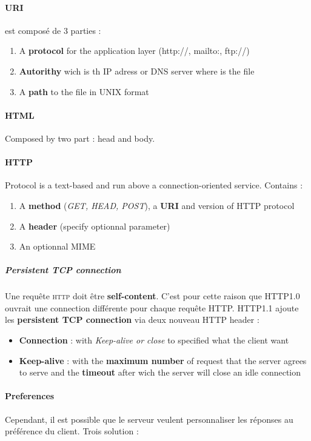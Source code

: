 \paragraph{\textbf{URI}} est composé de 3 parties :
\begin{enumerate}
    \item A \textbf{protocol} for the application layer (http://, mailto:, ftp://)
    \item \textbf{Autorithy} wich is th IP adress or DNS server where is the file
    \item A \textbf{path} to the file in UNIX format
\end{enumerate}

\paragraph{\textbf{HTML}} 
Composed by two part : head and body.

\paragraph{\textbf{HTTP}}
Protocol is a text-based and run above a connection-oriented service. Contains :
\begin{enumerate}
    \item A \textbf{method} (\textit{GET, HEAD, POST}), a \textbf{URI} and version of HTTP protocol
    \item A \textbf{header} (specify optionnal parameter)
    \item An optionnal MIME
\end{enumerate}

\subparagraph{Persistent TCP connection}
Une requête \textsc{http} doit être \textbf{self-content}. C'est pour cette
raison que HTTP1.0 ouvrait une connection différente pour chaque requête HTTP.
HTTP1.1 ajoute les \textbf{persistent TCP connection} via
deux nouveau HTTP header :
\begin{itemize}
    \item \textbf{Connection} : with \textit{Keep-alive or close} to specified what 
        the client want
    \item \textbf{Keep-alive} : with the \textbf{maximum number} of request that the server
        agrees to serve and the \textbf{timeout} after wich the server will close an idle connection
\end{itemize}

\paragraph{Preferences}
Cependant, il est possible que le serveur veulent personnaliser les réponses au préférence du client. Trois solution :

